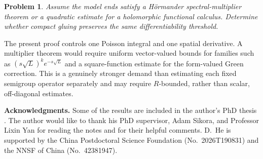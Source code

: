 \documentclass[12pt]{amsart}
\newtheorem{problem}[theorem]{Problem}
\theoremstyle{remark}
\begin{document}
\begin{problem}
\label{prob:spectral-multipliers}
Assume the model ends satisfy a H\"ormander spectral-multiplier theorem or a
quadratic estimate for a holomorphic functional calculus.  Determine whether compact gluing preserves the same differentiability threshold.
\end{problem}

The present proof controls one Poisson integral and one spatial derivative.
A multiplier theorem would require uniform vector-valued bounds for
families such as $(s\sqrt L)^ke^{-s\sqrt L}$ and a square-function estimate
for the form-valued Green correction.  This is a genuinely stronger demand
than estimating each fixed semigroup operator separately and may require
$R$-bounded, rather than scalar, off-diagonal estimates.

\smallskip


\textbf{Acknowledgments.}
Some of the results are included in the author's PhD thesis \cite{HePhD}. The author would like to thank his PhD supervisor, Adam Sikora, and Professor Lixin Yan for reading the notes and for their helpful comments. D.~He is supported by the China Postdoctoral Science Foundation (No.~2026T190831) and the NNSF of China (No.~42381947).











\end{document}
